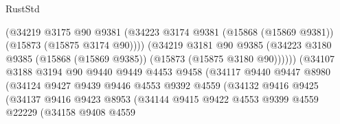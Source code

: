 \begin{lexlean}{RustStd}
\begin{coremodule}
                                      (@34219
                                        @3175
                                        @90
                                        @9381
                                        (@34223
                                          @3174
                                          @9381
                                          (@15868 (@15869 @9381))
                                          (@15873 (@15875 @3174 @90))))
                                      (@34219
                                        @3181
                                        @90
                                        @9385
                                        (@34223
                                          @3180
                                          @9385
                                          (@15868 (@15869 @9385))
                                          (@15873 (@15875 @3180 @90))))))
                                  (@34107
                                    @3188
                                    @3194
                                    @90
                                    @9440
                                    @9449
                                    @4453
                                    @9458
                                    (@34117
                                      @9440
                                      @9447
                                      @8980
                                      (@34124
                                        @9427
                                        @9439
                                        @9446
                                        @4553
                                        @9392
                                        @4559
                                        (@34132
                                          @9416
                                          @9425
                                          (@34137
                                            @9416
                                            @9423
                                            @8953
                                            (@34144
                                              @9415
                                              @9422
                                              @4553
                                              @9399
                                              @4559
                                              @22229
                                              (@34158
                                                @9408
                                                @4559

\end{coremodule}
\end{lexlean}
